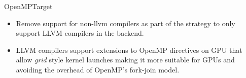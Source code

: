 
\begin{frame}[fragile]{OpenMPTarget}
  \begin{itemize}
      \item Remove support for non-llvm compilers as part of the strategy to only support LLVM compilers in the backend.
      \item LLVM compilers support extensions to OpenMP directives on GPU that allow \textit{grid} style kernel launches making it more suitable for GPUs and avoiding the overhead of OpenMP's fork-join model.
  \end{itemize}
\end{frame}

